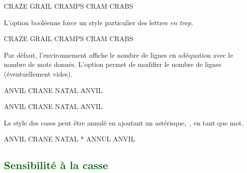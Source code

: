 \documentclass[svgnames]{report}
\newcommand\Section[1]{\subsection{\textcolor{DarkGreen}{#1}}}
\begin{document}
  \begin{example}
  \begin{GrilleSutom}[Strict=false]{CRAZE} %
    GRAIL
    CRAMPS
    CRAM
    CRABS
  \end{GrilleSutom}
  \end{example}

  L'option booléenne  force un style particulier des lettres \textit{en trop}.

  \begin{example}
  \begin{GrilleSutom}[Strict]{CRAZE}
    GRAIL
    CRAMPS
    CRAM
    CRABS
  \end{GrilleSutom}
  \end{example}


  Par défaut, l'environnement  affiche le nombre de lignes en adéquation avec le nombre de mots donnés. L'option  permet de modifier le nombre de lignes (éventuellement vides).

  \begin{example}
  \begin{GrilleSutom}[Lignes=4]{ANVIL}
    CRANE
    NATAL
    ANVIL
  \end{GrilleSutom}
  \end{example}

  \begin{example}
  \begin{GrilleSutom}[Lignes=2]{ANVIL}
    CRANE
    NATAL
    ANVIL
  \end{GrilleSutom}
  \end{example}

  \option[]{*}

  Le style des cases peut être annulé en ajoutant un astérisque,~\option{*}, en tant que mot.

  \begin{example}
  \begin{GrilleSutom}{ANVIL}
    CRANE
    NATAL
    *      %
    ANNUL
    ANVIL
  \end{GrilleSutom}
  \end{example}


  \Section{Sensibilité à la casse}
\end{document}
